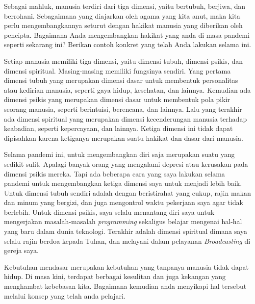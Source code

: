 \documentclass[
  11pt,
  answers  
]{exam}
\begin{document}
    \begin{questions}
      \question
      Sebagai mahluk, manusia terdiri dari tiga dimensi, yaitu bertubuh, berjiwa, dan berrohani.
      Sebagaimana yang diajarkan oleh agama yang kita anut, maka kita perlu mengembangkannya seturut
      dengan hakikat manusia yang diberikan oleh pencipta. Bagaimana Anda mengembangkan hakikat yang anda
      di masa pandemi seperti sekarang ini? Berikan contoh konkret yang telah Anda lakukan selama ini.
      \begin{solution}
        Setiap manusia memiliki tiga dimensi, yaitu dimensi tubuh, dimensi psikis, dan dimensi spiritual.
        Masing-masing memiliki fungsinya sendiri. Yang pertama dimensi tubuh yang merupakan dimensi dasar
        untuk membentuk personalitas atau kedirian manusia, seperti gaya hidup, kesehatan, dan lainnya.
        Kemudian ada dimensi psikis yang merupakan dimensi dasar untuk membentuk pola pikir seorang manusia,
        seperti berintuisi, berencana, dan lainnya. Lalu yang terakhir ada dimensi spiritual yang merupakan
        dimensi kecenderungan manusia terhadap keabadian, seperti kepercayaan, dan lainnya. Ketiga dimensi ini
        tidak dapat dipisahkan karena ketiganya merupakan suatu hakikat dan dasar dari manusia.

        Selama pandemi ini, untuk mengembangkan diri saja merupakan suatu yang sedikit sulit. Apalagi banyak orang
        yang mengalami depresi atau kerusakan pada dimensi psikis mereka. Tapi ada beberapa cara yang saya lakukan
        selama pandemi untuk mengembangkan ketiga dimensi saya untuk menjadi lebih baik. Untuk dimensi tubuh sendiri
        adalah dengan beristirahat yang cukup, rajin makan dan minum yang bergizi, dan juga mengontrol waktu pekerjaan
        saya agar tidak berlebih. Untuk dimensi psikis, saya selalu menantang diri saya untuk mengerjakan masalah-masalah
        \emph{programming} sekaligus belajar mengenai hal-hal yang baru dalam dunia teknologi. Terakhir adalah dimensi
        spiritual dimana saya selalu rajin berdoa kepada Tuhan, dan melayani dalam pelayanan \emph{Broadcasting} di gereja
        saya.
      \end{solution}

      \pagebreak

      \question
      Kebutuhan mendasar merupakan kebutuhan yang tanpanya manusia tidak dapat hidup. Di masa kini, terdapat
      berbagai kesulitan dan juga kekangan yang menghambat kebebasan kita. Bagaimana kemudian anda menyikapi
      hal tersebut melalui konsep yang telah anda pelajari.


\end{questions}
\end{document}
